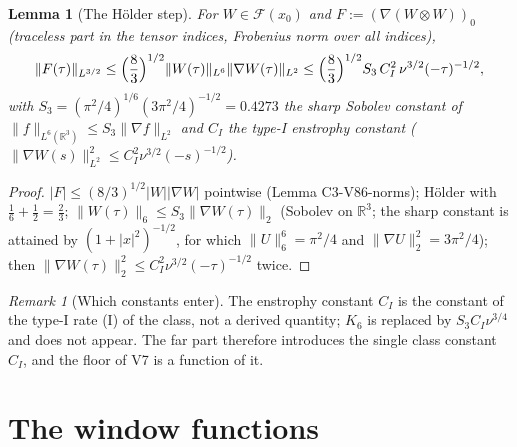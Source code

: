 \documentclass[11pt]{article}
\newcommand{\R}{\mathbb R}
\theoremstyle{plain}
\newtheorem{lemma}[theorem]{Lemma}
\theoremstyle{definition}
\theoremstyle{remark}
\newtheorem{remark}[theorem]{Remark}
\begin{document}
\begin{lemma}[The H\"older step]
\label{lem:c4v6-holder}
For \(W\in\mathcal F(x_0)\) and \(F:=(\nabla(W\otimes W))_0\) (traceless part in the tensor indices,
Frobenius norm over all indices),
\begin{equation}
 \|F(\tau)\|_{L^{3/2}}\le\Bigl(\frac83\Bigr)^{1/2}\|W(\tau)\|_{L^6}\|\nabla W(\tau)\|_{L^2}\le\Bigl(\frac83\Bigr)^{1/2}S_3\,C_I^2\,\nu^{3/2}(-\tau)^{-1/2},
 \label{eq:c4v6-holder}
\end{equation}
with \(S_3=(\pi^2/4)^{1/6}(3\pi^2/4)^{-1/2}=0.4273\) the sharp Sobolev constant of
\(\|f\|_{L^6(\R^3)}\le S_3\|\nabla f\|_{L^2}\) and \(C_I\) the type-I enstrophy constant
(\(\|\nabla W(s)\|_{L^2}^2\le C_I^2\nu^{3/2}(-s)^{-1/2}\)).
\end{lemma}

\begin{proof}
\(|F|\le(8/3)^{1/2}|W||\nabla W|\) pointwise (Lemma C3-V86-norms); H\"older with
\(\frac16+\frac12=\frac23\); \(\|W(\tau)\|_6\le S_3\|\nabla W(\tau)\|_2\) (Sobolev on \(\R^3\); the sharp
constant is attained by \((1+|x|^2)^{-1/2}\), for which \(\|U\|_6^6=\pi^2/4\) and
\(\|\nabla U\|_2^2=3\pi^2/4\)); then \(\|\nabla W(\tau)\|_2^2\le C_I^2\nu^{3/2}(-\tau)^{-1/2}\) twice.
\end{proof}

\begin{remark}[Which constants enter]
\label{rem:c4v6-constants}
The enstrophy constant \(C_I\) is the constant of the type-I rate (I) of
the class, not a derived quantity; \(K_6\) is replaced by \(S_3C_I\nu^{3/4}\) and does
not appear.  The far part therefore introduces the single class
constant \(C_I\), and the floor of V7 is a function of it.
\end{remark}

\section{The window functions}
\label{sec:c4v6-window}
\end{document}
